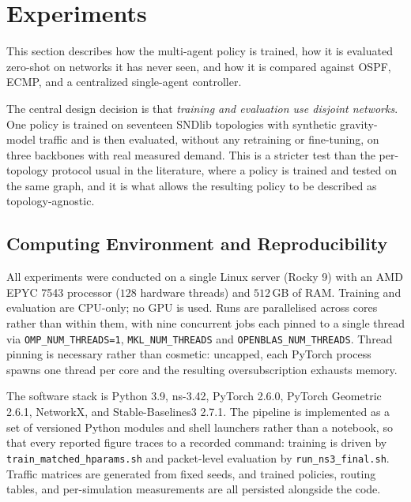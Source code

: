 \section{Experiments}


This section describes how the multi-agent policy is trained, how it is evaluated
zero-shot on networks it has never seen, and how it is compared against OSPF,
ECMP, and a centralized single-agent controller.

The central design decision is that \emph{training and evaluation use disjoint
networks}. One policy is trained on seventeen SNDlib topologies with synthetic
gravity-model traffic and is then evaluated, without any retraining or
fine-tuning, on three backbones with real measured demand. This is a stricter
test than the per-topology protocol usual in the literature, where a policy is
trained and tested on the same graph, and it is what allows the resulting policy
to be described as topology-agnostic.

\subsection{Computing Environment and Reproducibility}
\label{sec:setup-compute}

All experiments were conducted on a single Linux server (Rocky 9) with an AMD
EPYC 7543 processor ($128$ hardware threads) and $512$\,GB of RAM. Training and
evaluation are CPU-only; no GPU is used. Runs are parallelised across cores
rather than within them, with nine concurrent jobs each pinned to a single thread
via \texttt{OMP\_NUM\_THREADS=1}, \texttt{MKL\_NUM\_THREADS} and
\texttt{OPENBLAS\_NUM\_THREADS}. Thread pinning is necessary rather than
cosmetic: uncapped, each PyTorch process spawns one thread per core and the
resulting oversubscription exhausts memory.

The software stack is Python 3.9, ns-3.42, PyTorch 2.6.0, PyTorch Geometric
2.6.1, NetworkX, and Stable-Baselines3 2.7.1. The pipeline is implemented as a
set of versioned Python modules and shell launchers rather than a notebook, so
that every reported figure traces to a recorded command: training is driven by
\texttt{train\_matched\_hparams.sh} and packet-level evaluation by
\texttt{run\_ns3\_final.sh}. Traffic matrices are generated from fixed seeds, and
trained policies, routing tables, and per-simulation measurements are all
persisted alongside the code.

